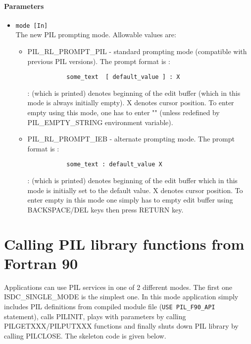 \paragraph{Parameters}
\begin{itemize}
\item
{\tt mode [In] } \\
The new PIL prompting mode. Allowable values are:

\begin{itemize}
\item PIL\_RL\_PROMPT\_PIL - standard prompting mode (compatible
with previous PIL versions). The prompt format is :

\begin{verbatim}
           some_text  [ default_value ] : X
\end{verbatim}

: (which is printed) denotes beginning of the edit buffer (which in 
this mode is always initially empty).
X denotes cursor position. To enter empty using this mode, one has to
enter "" (unless redefined by PIL\_EMPTY\_STRING environment variable).

\item PIL\_RL\_PROMPT\_IEB - alternate prompting mode. The prompt
format is :

\begin{verbatim}
           some_text : default_value X
\end{verbatim}

: (which is printed) denotes beginning of the edit buffer which in 
this mode is initially set to the default value.
X denotes cursor position. To enter empty in this mode one
simply has to empty edit buffer using BACKSPACE/DEL keys then 
press RETURN key.
\end{itemize}
\end{itemize}


\section{Calling PIL library functions from Fortran 90}\label{PILRefF90calling}

Applications can use PIL services in one of 2 different modes. The first one
ISDC\_SINGLE\_MODE is the simplest
one. In this mode application simply includes PIL definitions from compiled
module file ({\tt USE PIL\_F90\_API } statement),
calls PILINIT, plays with parameters by calling
PILGETXXX/PILPUTXXX functions and finally shuts
down PIL library by calling PILCLOSE. The skeleton code is given below. 


